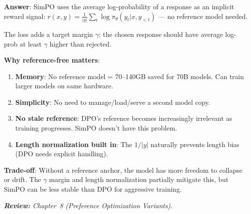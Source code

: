 \begin{questionbox}
\textbf{Answer}: SimPO uses the average log-probability of a response as an implicit reward signal: $r(x,y) = \frac{1}{|y|}\sum_t \log \pi_\theta(y_t|x, y_{<t})$ --- no reference model needed.

The loss adds a target margin $\gamma$: the chosen response should have average log-prob at least $\gamma$ higher than rejected.

\textbf{Why reference-free matters}:

\begin{enumerate}
  \item \textbf{Memory}: No reference model = 70--140GB saved for 70B models. Can train larger models on same hardware.
  \item \textbf{Simplicity}: No need to manage/load/serve a second model copy.
  \item \textbf{No stale reference}: DPO’s reference becomes increasingly irrelevant as training progresses. SimPO doesn’t have this problem.
  \item \textbf{Length normalization built in}: The $1/|y|$ naturally prevents length bias (DPO needs explicit handling).
\end{enumerate}

\textbf{Trade-off}: Without a reference anchor, the model has more freedom to collapse or drift. The $\gamma$ margin and length normalization partially mitigate this, but SimPO can be less stable than DPO for aggressive training.

\emph{\textbf{Review:} Chapter~8 (Preference Optimization Variants).}
\end{questionbox}

